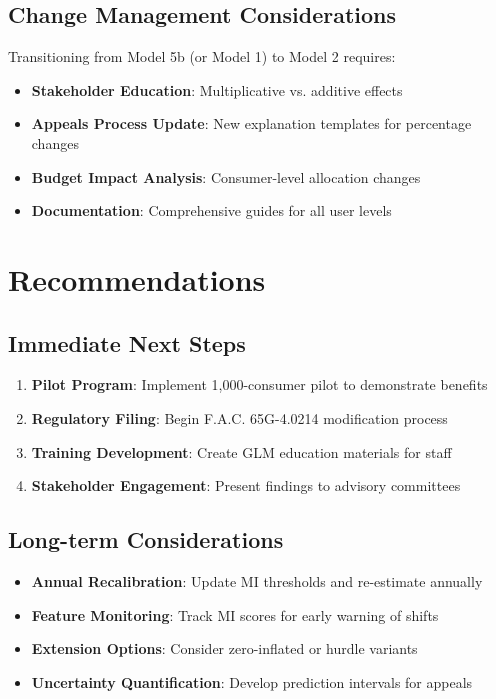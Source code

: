 \subsection{Change Management Considerations}

Transitioning from Model 5b (or Model 1) to Model 2 requires:
\begin{itemize}
    \item \textbf{Stakeholder Education}: Multiplicative vs. additive effects
    \item \textbf{Appeals Process Update}: New explanation templates for percentage changes
    \item \textbf{Budget Impact Analysis}: Consumer-level allocation changes
    \item \textbf{Documentation}: Comprehensive guides for all user levels
\end{itemize}

\section{Recommendations}

\subsection{Immediate Next Steps}

\begin{enumerate}
    \item \textbf{Pilot Program}: Implement 1,000-consumer pilot to demonstrate benefits
    \item \textbf{Regulatory Filing}: Begin F.A.C. 65G-4.0214 modification process
    \item \textbf{Training Development}: Create GLM education materials for staff
    \item \textbf{Stakeholder Engagement}: Present findings to advisory committees
\end{enumerate}

\subsection{Long-term Considerations}

\begin{itemize}
    \item \textbf{Annual Recalibration}: Update MI thresholds and re-estimate annually
    \item \textbf{Feature Monitoring}: Track MI scores for early warning of shifts
    \item \textbf{Extension Options}: Consider zero-inflated or hurdle variants
    \item \textbf{Uncertainty Quantification}: Develop prediction intervals for appeals
\end{itemize}

